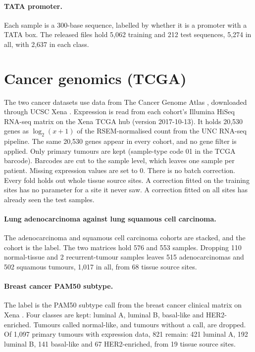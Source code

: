 \paragraph{TATA promoter.} Each sample is a 300-base sequence, labelled by whether it is a promoter with a TATA box. The released files hold 5,062 training and 212 test sequences, 5,274 in all, with 2,637 in each class.

\section{Cancer genomics (TCGA)}\label{app:datasets:tcga}

The two cancer datasets use data from The Cancer Genome Atlas \citep{Weinstein2013}, downloaded through UCSC Xena \citep{Goldman2020}. Expression is read from each cohort's Illumina HiSeq RNA-seq matrix on the Xena TCGA hub (version 2017-10-13). It holds 20,530 genes as $\log_2(x+1)$ of the RSEM-normalised count \citep{Li2011RSEM} from the UNC RNA-seq pipeline. The same 20,530 genes appear in every cohort, and no gene filter is applied. Only primary tumours are kept (sample-type code 01 in the TCGA barcode). Barcodes are cut to the sample level, which leaves one sample per patient. Missing expression values are set to 0. There is no batch correction. Every fold holds out whole tissue source sites. A correction fitted on the training sites has no parameter for a site it never saw. A correction fitted on all sites has already seen the test samples.

\paragraph{Lung adenocarcinoma against lung squamous cell carcinoma.} The adenocarcinoma \citep{TCGA2014LUAD} and squamous cell carcinoma \citep{TCGA2012LUSC} cohorts are stacked, and the cohort is the label. The two matrices hold 576 and 553 samples. Dropping 110 normal-tissue and 2 recurrent-tumour samples leaves 515 adenocarcinomas and 502 squamous tumours, 1,017 in all, from 68 tissue source sites.

\paragraph{Breast cancer PAM50 subtype.} The label is the PAM50 subtype call \citep{Parker2009} from the breast cancer clinical matrix on Xena \citep{TCGA2012BRCA}. Four classes are kept: luminal A, luminal B, basal-like and HER2-enriched. Tumours called normal-like, and tumours without a call, are dropped. Of 1,097 primary tumours with expression data, 821 remain: 421 luminal A, 192 luminal B, 141 basal-like and 67 HER2-enriched, from 19 tissue source sites.
